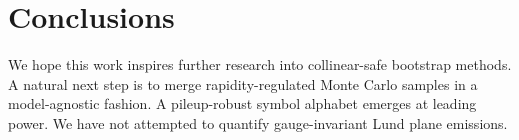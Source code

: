 \section{Conclusions}\label{sec:conclusions}

We hope this work inspires further research into collinear-safe
bootstrap methods. A natural next step is to merge rapidity-regulated
Monte Carlo samples in a model-agnostic fashion. A pileup-robust symbol
alphabet emerges at leading power. We have not attempted to quantify
gauge-invariant Lund plane emissions.

